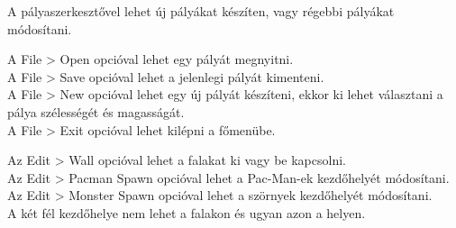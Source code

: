 \documentclass{article}
\begin{document}
A pályaszerkesztővel lehet új pályákat készíten, vagy régebbi pályákat
módosítani.

A File > Open opcióval lehet egy pályát megnyitni.\\
A File > Save opcióval lehet a jelenlegi pályát kimenteni.\\
A File > New opcióval lehet egy új pályát készíteni, ekkor ki lehet választani
a pálya szélességét és magasságát.\\
A File > Exit opcióval lehet kilépni a főmenübe.

Az Edit > Wall opcióval lehet a falakat ki vagy be kapcsolni.\\
Az Edit > Pacman Spawn opcióval lehet a Pac-Man-ek kezdőhelyét módosítani.\\
Az Edit > Monster Spawn opcióval lehet a szörnyek kezdőhelyét módosítani.\\
A két fél kezdőhelye nem lehet a falakon és ugyan azon a helyen.
\end{document}
